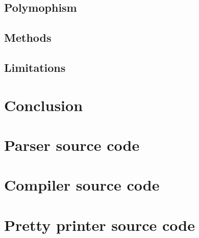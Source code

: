 \documentclass[11pt]{article}
\begin{document}
\subsection{Polymophism}
\subsection{Methods}
\subsection{Limitations}

\section{Conclusion}

{} 


\appendix
\section{Parser source code}
\label{app:parser}

\section{Compiler source code}
\label{app:compiler}

\section{Pretty printer source code}
\label{app:pretty}
\end{document}
